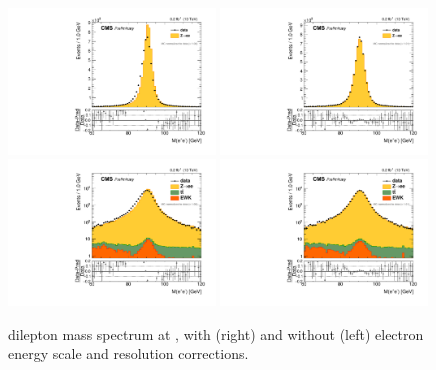 \begin{figure}[htbp]
\centering
\includegraphics[width=0.49\textwidth]{plots/LepScaleSmear/plotZee13TeV_noCorr/zee_norm.pdf}
\includegraphics[width=0.49\textwidth]{plots/LepScaleSmear/plotZee13TeV_corr/zee_norm.pdf}
\\
\includegraphics[width=0.49\textwidth]{plots/LepScaleSmear/plotZee13TeV_noCorr/zeelog_norm.pdf}
\includegraphics[width=0.49\textwidth]{plots/LepScaleSmear/plotZee13TeV_corr/zeelog_norm.pdf}
\caption{\zee dilepton mass spectrum at \sh, with (right) and without (left) electron energy scale and resolution corrections.}
\label{fig:lepscale:zee:13}
\end{figure}